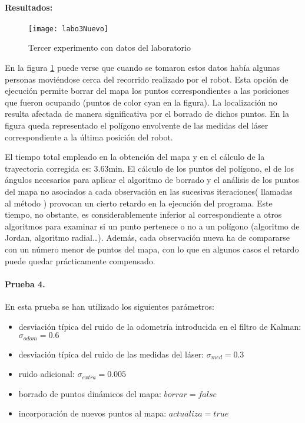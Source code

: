 \paragraph{Resultados:}

\begin{figure}[h]
  \centering\texttt{[image: labo3Nuevo]}\\
  \caption{Tercer experimento con datos del laboratorio}\label{fg:labo3}
\end{figure}

En la figura \ref{fg:labo3} puede verse que cuando se tomaron estos datos había algunas personas moviéndose cerca del recorrido realizado por el robot. Esta opción de ejecución permite borrar del mapa los puntos correspondientes a las posiciones que fueron ocupando (puntos de color cyan en la figura). La localización no resulta afectada de manera significativa por el borrado de dichos puntos. En la figura queda representado el polígono envolvente de las medidas del láser correspondiente a la última posición del robot.

El tiempo total empleado en la obtención del mapa y en el cálculo de la trayectoria corregida es: 3.63min. El cálculo de los puntos del polígono, el de los ángulos necesarios para aplicar el algoritmo de borrado y el análisis de los puntos del mapa no asociados a cada observación en las sucesivas iteraciones( llamadas al método ) provocan un cierto retardo en la ejecución del programa. Este tiempo, no obstante, es considerablemente inferior al correspondiente a otros algoritmos para examinar si un punto pertenece o no a un polígono (algoritmo de Jordan, algoritmo radial\ldots). Además, cada observación nueva ha de compararse con un número menor de puntos del mapa, con lo que en algunos casos el retardo puede quedar prácticamente compensado.

\paragraph{Prueba 4.}
En esta prueba se han utilizado los siguientes parámetros:

\begin{itemize}
  \item desviación típica del ruido de la odometría introducida en el filtro de Kalman: $\sigma_{odom} = 0.6$
  \item desviación típica del ruido de las medidas del láser: $\sigma_{med} = 0.3$
  \item ruido adicional: $\sigma_{extra} = 0.005$
  \item borrado de puntos dinámicos del mapa: $borrar = false$
  \item incorporación de nuevos puntos al mapa: $actualiza = true$
\end{itemize}


